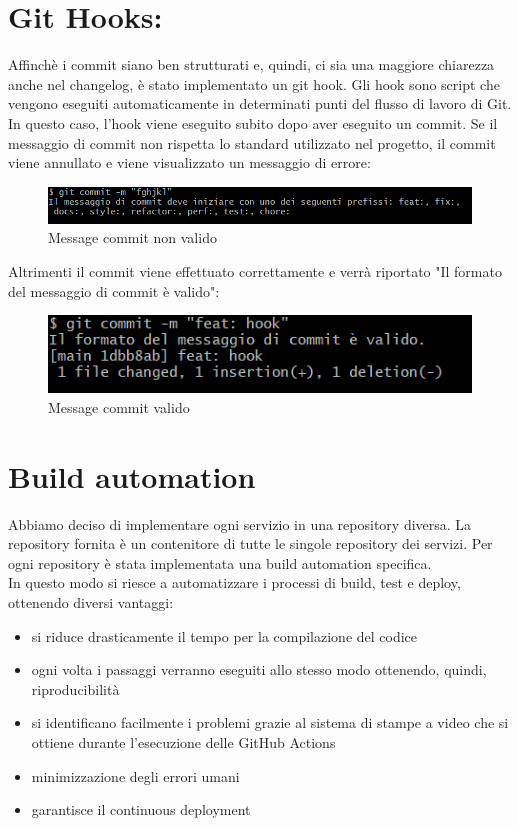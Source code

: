 \section{Git Hooks:}
Affinchè i commit siano ben strutturati e, quindi, ci sia una maggiore chiarezza anche nel changelog, è stato implementato un git hook.
Gli hook sono script che vengono eseguiti automaticamente in determinati punti del flusso di lavoro di Git.
In questo caso, l'hook viene eseguito subito dopo aver eseguito un commit.
Se il messaggio di commit non rispetta lo standard utilizzato nel progetto, il commit viene annullato e viene visualizzato un messaggio di errore:
\begin{figure}[H]
    \centering 
    \includegraphics[scale=0.7]{report/img/not_valid_msg_hook.png}
    \caption{Message commit non valido}
    \label{commit_hook}
\end{figure}
Altrimenti il commit viene effettuato correttamente e verrà riportato "Il formato del messaggio di commit è valido":
\begin{figure}[H]
    \centering 
    \includegraphics[scale=0.7]{report/img/commit_msg_hook.png}
    \caption{Message commit valido}
    \label{commit_hook_valid}
\end{figure}

\section{Build automation}
Abbiamo deciso di implementare ogni servizio in una repository diversa. La repository fornita è un contenitore di tutte le singole repository dei servizi.
Per ogni repository è stata implementata una build automation specifica. \\
In questo modo si riesce a automatizzare i processi di build, test e deploy, ottenendo diversi vantaggi:
\begin{itemize}
    \item si riduce drasticamente il tempo per la compilazione del codice
    \item ogni volta i passaggi verranno eseguiti allo stesso modo ottenendo, quindi, riproducibilità
    \item si identificano facilmente i problemi grazie al sistema di stampe a video che si ottiene durante l'esecuzione delle GitHub Actions
    \item minimizzazione degli errori umani
    \item garantisce il continuous deployment 
\end{itemize}

